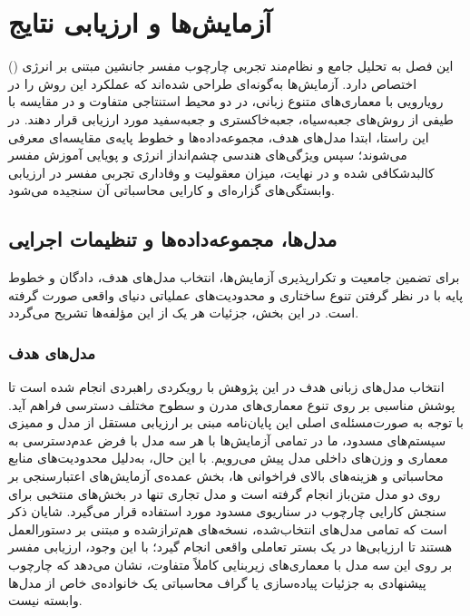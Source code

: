 
\chapter{آزمایش‌ها و ارزیابی نتایج}\label{chap:chapter5_experiments}

این فصل به تحلیل جامع و نظام‌مند تجربی چارچوب مفسر جانشین مبتنی بر انرژی () اختصاص دارد. آزمایش‌ها به‌گونه‌ای طراحی شده‌اند که عملکرد این روش را در رویارویی با معماری‌های متنوع زبانی، در دو محیط استنتاجی متفاوت و در مقایسه با طیفی از روش‌های جعبه‌سیاه، جعبه‌خاکستری و جعبه‌سفید مورد ارزیابی قرار دهند. در این راستا، ابتدا مدل‌های هدف، مجموعه‌داده‌ها و خطوط پایه‌ی مقایسه‌ای معرفی می‌شوند؛ سپس ویژگی‌های هندسی چشم‌انداز انرژی و پویایی آموزش مفسر کالبدشکافی شده و در نهایت، میزان معقولیت و وفاداری تجربی مفسر در ارزیابی وابستگی‌های گزاره‌ای و کارایی محاسباتی آن سنجیده می‌شود.


\section{مدل‌ها، مجموعه‌داده‌ها و تنظیمات اجرایی}\label{sec:5-1}

برای تضمین جامعیت و تکرارپذیری آزمایش‌ها، انتخاب مدل‌های هدف، دادگان و خطوط پایه با در نظر گرفتن تنوع ساختاری و محدودیت‌های عملیاتی دنیای واقعی صورت گرفته است. در این بخش، جزئیات هر یک از این مؤلفه‌ها تشریح می‌گردد.


\subsection{مدل‌های هدف}\label{sec:5-1-1}

انتخاب مدل‌های زبانی هدف در این پژوهش با رویکردی راهبردی انجام شده است تا پوشش مناسبی بر روی تنوع معماری‌های مدرن و سطوح مختلف دسترسی فراهم آید. با توجه به صورت‌مسئله‌ی اصلی این پایان‌نامه مبنی بر ارزیابی مستقل از مدل و ممیزی سیستم‌های مسدود، ما در تمامی آزمایش‌ها با هر سه مدل با فرض عدم‌دسترسی به معماری و وزن‌های داخلی مدل پیش می‌رویم. با این حال، به‌دلیل محدودیت‌های منابع محاسباتی و هزینه‌های بالای فراخوانی ها، بخش عمده‌ی آزمایش‌های اعتبارسنجی بر روی دو مدل متن‌باز انجام گرفته است و مدل تجاری تنها در بخش‌های منتخبی برای سنجش کارایی چارچوب در سناریوی مسدود مورد استفاده قرار می‌گیرد. شایان ذکر است که تمامی مدل‌های انتخاب‌شده، نسخه‌های هم‌ترازشده و مبتنی بر دستورالعمل هستند تا ارزیابی‌ها در یک بستر تعاملی واقعی انجام گیرد؛ با این وجود، ارزیابی مفسر بر روی این سه مدل با معماری‌های زیربنایی کاملاً متفاوت، نشان می‌دهد که چارچوب پیشنهادی به جزئیات پیاده‌سازی یا گراف محاسباتی یک خانواده‌ی خاص از مدل‌ها وابسته نیست.

